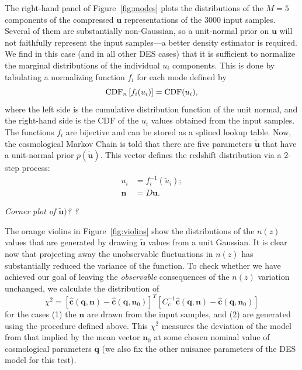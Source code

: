 \documentclass[linenumbers, onecolumn]{aastex63}
\newcommand{\vecq}{\ensuremath{\mathbf{q}}}
\newcommand{\vecn}{\ensuremath{\mathbf{n}}}
\newcommand{\vecu}{\ensuremath{\mathbf{u}}}
\newcommand{\hatc}{\ensuremath{\hat{\mathbf{c}}}}
\newcommand{\covm}{C}
\newcommand{\matD}{D}
\begin{document}
The right-hand panel of Figure~\ref{fig:modes} plots the distributions
of the $M=5$ components of the compressed $\vecu$ representations of the
3000 input samples.  Several of them are substantially non-Gaussian,
so a unit-normal prior on $\vecu$ will not faithfully represent the
input samples---a better density estimator is required.  We find in
this case (and in all other DES cases) that it is sufficient to
normalize the marginal distributions of the individual $u_i$
components.  This is done by tabulating a normalizing function $f_i$
for each mode defined by
\begin{equation}
  {\rm CDF}_n\left[ f_i(u_i) \right] = {\rm CDF}(u_i),
\end{equation}
where the left side is the cumulative distribution function of the
unit normal, and the right-hand side is the CDF of the $u_i$ values
obtained from the input samples.  The functions $f_i$ are bijective
and can be stored as a splined lookup table.
Now, the cosmological Markov Chain
is told that there are five parameters $\widetilde{\vecu}$ that have a
unit-normal prior $p(\widetilde{\vecu}).$  This vector defines the
redshift distribution via a 2-step process:
\begin{align}
  u_i & =f_i^{-1}(\widetilde{u}_i); \\
  \vecn & = \matD \vecu.
\end{align}

\textit{Corner plot of $\widetilde{\vecu})$? ?}


The orange violins in Figure~\ref{fig:violins} show the distributions
of the $n(z)$ values that are generated by drawing $\widetilde{\vecu}$
values from a unit Gaussian.  It is clear now that projecting away the
unobservable fluctuations in $n(z)$ has substantially reduced the
variance of the function.  To check whether we have achieved our goal
of leaving the \emph{observable} consequences of the $n(z)$ variation
unchanged, we calculate the distribution of
\begin{equation}
  \chi^2 =  \left[\hatc(\vecq,\vecn) - \hatc(\vecq,\vecn_0) \right]^T
                                            \left[\covm_c^{-1} \hatc(\vecq,\vecn) - \hatc(\vecq,\vecn_0)\right]
\label{eq:chihist}
\end{equation}
for the cases (1) the $\vecn$ are drawn from the input samples, and
(2) are generated using the procedure defined above.  This $\chi^2$
measures the deviation of the model from that implied by the mean
vector $\vecn_0$ at some chosen nominal value of cosmological
parameters $\vecq$ (we also fix the other nuisance parameters of the
DES model for this test).
\end{document}
